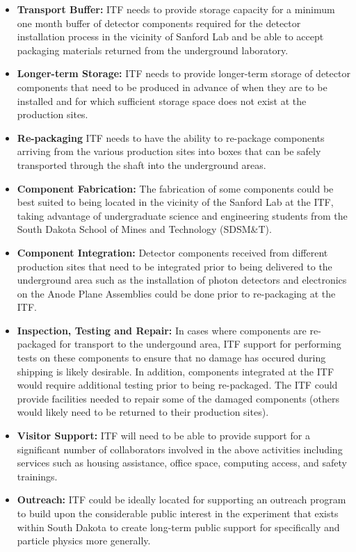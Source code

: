 \begin{itemize}
  \item {\bf Transport Buffer:} ITF needs to provide storage capacity 
    for a minimum one month buffer of detector components required for 
    the detector installation process in the vicinity of Sanford Lab and 
    be able to accept packaging materials returned from the underground 
    laboratory.
  \item {\bf Longer-term Storage:}  ITF needs to provide longer-term 
    storage of detector components that need to be produced in advance 
    of when they are to be installed and for which sufficient storage 
    space does not exist at the production sites.      
  \item {\bf Re-packaging} ITF needs to have the ability to re-package 
    components arriving from the various production sites into boxes that
    can be safely transported through the shaft into the underground areas.  
  \item {\bf Component Fabrication:}  The fabrication of some components 
    could be best suited to being located in the vicinity of the Sanford 
    Lab at the ITF, taking advantage of undergraduate science and engineering 
    students from the South Dakota School of Mines and Technology (SDSM\&T).
  \item {\bf Component Integration:} Detector components received from 
    different production sites that need to be integrated prior to being 
    delivered to the underground area such as the installation of photon 
    detectors and electronics on the Anode Plane Assemblies could be done
    prior to re-packaging at the ITF.    
  \item {\bf Inspection, Testing and Repair:} In cases where components 
    are re-packaged for transport to the undergound area, ITF support 
    for performing tests on these components to ensure that no damage has 
    occured during shipping is likely desirable.  In addition, components 
    integrated at the ITF would require additional testing prior to being 
    re-packaged.  The ITF could provide facilities needed to repair some 
    of the damaged components (others would likely need to be returned to
    their production sites).     
  \item {\bf Visitor Support:} ITF will need to be able to provide support 
    for a significant number of  collaborators involved in the 
    above activities including services such as housing assistance, office 
    space, computing access, and safety trainings. 
  \item {\bf Outreach:} ITF could be ideally located for supporting an 
    outreach program to build upon the considerable public interest in 
    the experiment that exists within South Dakota to create long-term 
    public support for  specifically and particle physics 
    more generally.
\end{itemize}

